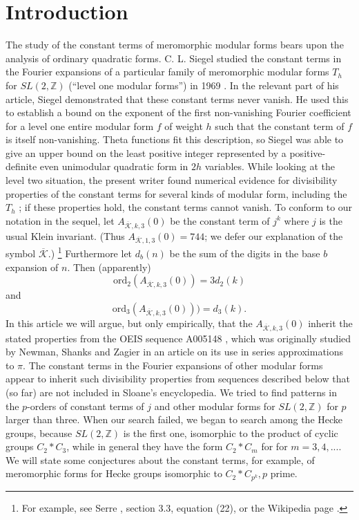 \documentclass{article}
\begin{document}
\section{Introduction}
The study of the 
constant terms of meromorphic modular forms
bears upon the analysis  of ordinary 
quadratic forms.
C. L. Siegel studied the constant terms in the
Fourier expansions of a particular family 
of meromorphic modular forms $T_h$ for
$SL(2,\mathbb{Z})$ (``level one modular forms'') 
in 1969
\cite{siegel1969berechnung, siegel1980evaluation}.
In the relevant 
part of his article, Siegel
demonstrated that these constant terms never vanish.
He used this to 
establish a bound on 
the exponent of the first non-vanishing Fourier 
coefficient for
a level one entire modular form $f$ of weight 
$h$ such that the
constant term of $f$ is itself non-vanishing. 
Theta 
functions fit this description, so Siegel 
was able to give an upper 
bound on the least positive integer 
represented by a positive-definite
even unimodular quadratic form in $2h$ variables.
\newline \newline \noindent
While looking at the level two situation,
the present writer found 
numerical evidence for
divisibility properties of the constant terms 
for several kinds of modular form, including 
the $T_h$ \cite{brent1998quadratic}; 
if these properties hold, the constant terms 
cannot vanish. 
To conform to our notation in the sequel,
let $A_{\overline{\mathcal{K}},k,3}(0)$ 
be the constant
term of $j^k$ where $j$ is the usual  
Klein invariant. 
(Thus $A_{\overline{\mathcal{K}},1,3}(0) = 744$;
we defer our explanation of the symbol 
$\overline{\mathcal{K}}$.)
\footnote{For example, see Serre \cite{serre1970course}, 
section 3.3, equation (22), or the Wikipedia page
\cite{jWiki}.}
Furthermore let $d_b(n)$ be the sum of the digits in 
the base $b$
expansion of $n$. Then (apparently) 
$$\text{ord}_2(A_{\overline{\mathcal{K}},k,3}(0)) 
= 3d_2(k)$$
and $$\text{ord}_3(A_{\overline{\mathcal{K}},k,3}(0))) = 
d_3(k).$$ 
In this 
article we will argue, but only
empirically, that the 
$A_{\overline{\mathcal{K}},k,3}(0)$ 
inherit the stated properties from the 
OEIS sequence A005148 \cite{OEISNewmanShanks},
which was originally studied by Newman, Shanks
and Zagier
\cite{newman2004sequence, 
newman2004sequenceAppendix}
in an article on its use in series 
approximations to $\pi$. The constant terms
in the Fourier expansions of other modular
forms appear to inherit such divisibility 
properties from sequences described below
that (so far) are not included in 
Sloane's encyclopedia.
\newline \newline \noindent
We tried 
to find patterns in the
$p$-orders of constant terms of 
$j$ and other modular forms for
$SL(2,\mathbb{Z})$ for $p$ larger than three.
When our search failed, we 
began to search among the  Hecke groups,
because $SL(2,\mathbb{Z})$ is the first one, 
isomorphic to the product of
cyclic groups $C_2*C_3$,
while in general they 
have the form $C_2*C_m$ for 
for $m = 3, 4, ....$
We will state some conjectures
about the constant terms, for example, of
meromorphic forms for
Hecke groups isomorphic to $C_2*C_{p^k}, p$
prime.
\end{document}
